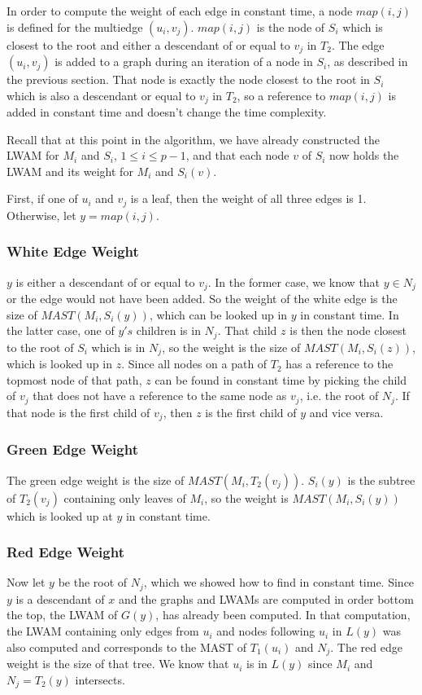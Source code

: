 In order to compute the weight of each edge in constant time, a node $map(i,j)$ is defined for the multiedge $(u_i,v_j)$. $map(i,j)$ is the node of $S_i$ which is closest to the root and either a descendant of or equal to $v_j$ in $T_2$. The edge $(u_i,v_j)$ is added to a graph during an iteration of a node in $S_i$, as described in the previous section. That node is exactly the node closest to the root in $S_i$ which is also a descendant or equal to $v_j$ in $T_2$, so a reference to $map(i,j)$ is added in constant time and doesn't change the time complexity.

Recall that at this point in the algorithm, we have already constructed the LWAM for $M_i$ and $S_i$, $1 \le i \le p-1$, and that each node $v$ of $S_i$ now holds the LWAM and its weight for $M_i$ and $S_i(v)$.

First, if one of $u_i$ and $v_j$ is a leaf, then the weight of all three edges is 1. Otherwise, let $y=map(i,j)$.

\subsubsection{White Edge Weight}
$y$ is either a descendant of or equal to $v_j$. In the former case, we know that $y \in N_j$ or the edge would not have been added. So the weight of the white edge is the size of $MAST(M_i, S_i(y))$, which can be looked up in $y$ in constant time. In the latter case, one of $y's$ children is in $N_j$. That child $z$ is then the node closest to the root of $S_i$ which is in $N_j$, so the weight is the size of $MAST(M_i, S_i(z))$, which is looked up in $z$. Since all nodes on a path of $T_2$ has a reference to the topmost node of that path, $z$ can be found in constant time by picking the child of $v_j$ that does not have a reference to the same node as $v_j$, i.e. the root of $N_j$. If that node is the first child of $v_j$, then $z$ is the first child of $y$ and vice versa.

\subsubsection{Green Edge Weight}
The green edge weight is the size of $MAST(M_i,T_2(v_j))$. $S_i(y)$ is the subtree of $T_2(v_j)$ containing only leaves of $M_i$, so the weight is $MAST(M_i, S_i(y))$ which is looked up at $y$ in constant time.

\subsubsection{Red Edge Weight}
Now let $y$ be the root of $N_j$, which we showed how to find in constant time. Since $y$ is a descendant of $x$ and the graphs and LWAMs are computed in order bottom the top, the LWAM of $G(y)$, has already been computed. In that computation, the LWAM containing only edges from $u_i$ and nodes following $u_i$ in $L(y)$ was also computed and corresponds to the MAST of $T_1(u_i)$ and $N_j$. The red edge weight is the size of that tree. We know that $u_i$ is in $L(y)$ since $M_i$ and $N_j = T_2(y)$ intersects.\\


